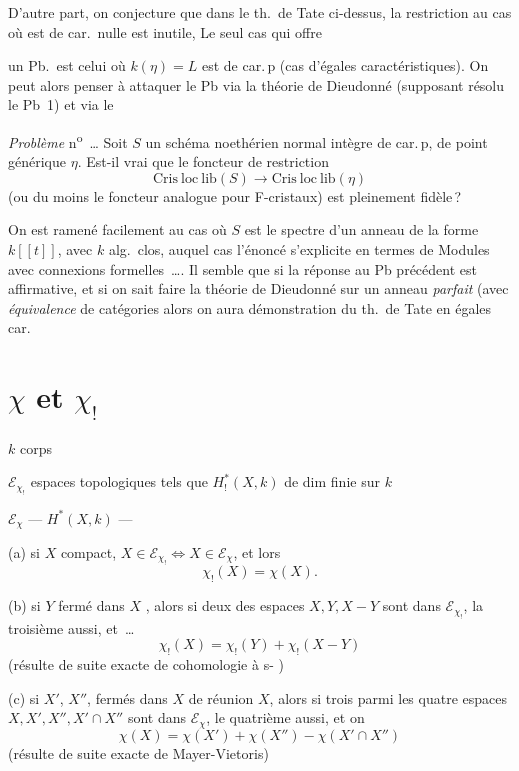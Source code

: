 \documentclass[11pt,a4paper]{article}
\begin{document}
D'autre part, on conjecture que dans le th.\ de Tate ci-dessus, la restriction au cas où   est de car.\ nulle est inutile, Le seul cas qui offre

un Pb.\ est celui où $k(\eta) = L$ est de car.\,p (cas d'égales caractéristiques). On peut alors penser à attaquer le Pb via la théorie de Dieudonné (supposant résolu le Pb~1) et via le

\emph{Problème} n\textsuperscript{o}~… Soit $S$ un schéma noethérien normal  intègre de car.\,p, de point générique $\eta$. Est-il vrai que le foncteur de restriction
\[
  \mathrm{Cris\ loc\ lib}(S) \longrightarrow \mathrm{Cris\ loc\ lib}(\eta)
\]
(ou du moins le foncteur analogue pour F-cristaux) est pleinement fidèle\,?

On est ramené facilement au cas où $S$ est le spectre d'un anneau de la forme $k[[t]]$, avec $k$ alg.\ clos, auquel cas l'énoncé s'explicite en termes de Modules avec connexions formelles~…. Il semble que si la réponse au Pb précédent est affirmative,  et si on sait faire la théorie de Dieudonné sur un anneau \emph{parfait} (avec \emph{équivalence} de catégories alors on aura démonstration du th.\ de Tate en égales car.

\section{$\chi$ et $\chi_!$}

$k$ corps

$\mathcal{E}_{\chi_!}$ espaces topologiques  tels que $H^*_!(X,k)$ de dim finie sur $k$ 

$\mathcal{E}_{\chi}$ \quad --- \quad $H^*(X,k)$ \quad --- 

(a) \struck{\ill{}} si $X$ compact, $X \in \mathcal{E}_{\chi_!} \Longleftrightarrow X \in \mathcal{E}_{\chi}$, et lors
\[
  \chi_!(X) = \chi(X) .
\]

(b) si $Y$ fermé dans $X$ , alors si deux des espaces $X, Y, X-Y$ sont dans $\mathcal{E}_{\chi_!}$, la troisième aussi, et~…
\[
  \chi_!(X) = \chi_!(Y) + \chi_!(X-Y)
\]
(résulte de suite exacte de cohomologie à s- )

(c) si $X'$, $X''$, \struck{\ill{}} fermés dans $X$ de réunion $X$, alors si trois parmi les quatre espaces $X, X', X'', X' \cap X''$ sont dans $\mathcal{E}_{\chi}$, le quatrième aussi, et on
\[
  \chi(X) = \chi(X') + \chi(X'') - \chi(X' \cap X'')
\]
(résulte de suite exacte de Mayer-Vietoris)
\end{document}
